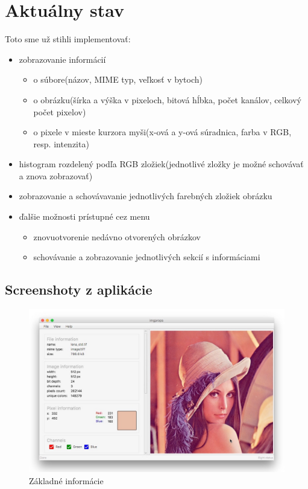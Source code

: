 \documentclass[12pt,a4paper,titlepage,final]{article}
\begin{document}
\section{Aktuálny stav}
Toto sme už stihli implementovať:
\begin{itemize}
	\item zobrazovanie informácií
		\begin{itemize}
			\item o súbore(názov, MIME typ, veľkosť v bytoch)
			\item o obrázku(šírka a výška v pixeloch, bitová hĺbka, počet kanálov, celkový počet pixelov)
			\item o pixele v mieste kurzora myši(x-ová a y-ová súradnica, farba v RGB, resp. intenzita)
		\end{itemize}
	\item histogram rozdelený podľa RGB zložiek(jednotlivé zložky je možné schovávať a znova zobrazovať)
	\item zobrazovanie a schovávavanie jednotlivých farebných zložiek obrázku
	\item ďalšie možnosti prístupné cez menu
		\begin{itemize}
		\item znovuotvorenie nedávno otvorených obrázkov
		\item schovávanie a zobrazovanie jednotlivých sekcií s informáciami 
		\end{itemize}
	
\end{itemize}
\subsection{Screenshoty z aplikácie}
\begin{figure}[!h]
	\centering
	\includegraphics[width=15cm]{img/screenshot1.jpeg}
	\caption{Základné informácie}
\end{figure}
\end{document}
